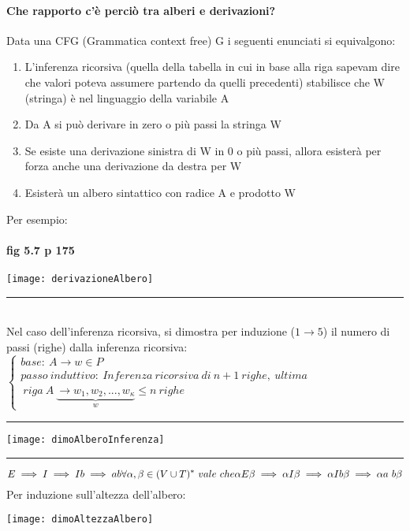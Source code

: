 \documentclass[12pt, a4paper, openany, oneside]{book}
\begin{document}
\paragraph{Che rapporto c'è perciò tra alberi e derivazioni?}  
Data una CFG (Grammatica context free) G i seguenti enunciati si equivalgono:
\begin{enumerate}
	\item L'inferenza ricorsiva (quella della tabella in cui in base alla riga
	sapevam dire che valori poteva assumere partendo da quelli precedenti) 
	stabilisce che W (stringa) è nel linguaggio della variabile A
	\item Da A si può derivare in zero o più passi la stringa W
	\item Se esiste una derivazione sinistra di W in 0 o più passi, allora
	esisterà per forza anche una derivazione da destra per W
	\item Esisterà un albero sintattico con radice A e prodotto W
\end{enumerate}
Per esempio: 
\paragraph{fig 5.7 p 175}
\begin{center}
\texttt{[image: derivazioneAlbero]}
\end{center}
{\color{black} \rule{\linewidth}{0.3mm}}
\\
Nel caso dell'inferenza ricorsiva, si dimostra per induzione ($1 \to 5$) il numero
di passi (righe) dalla inferenza ricorsiva: 
$\begin{cases}
base: ~ A \to w \in P \\
passo~induttivo: ~ Inferenza ~ ricorsiva ~  di ~  n+1  ~ righe, ~  ultima \\ 
~ riga ~  A ~ \underbrace{\to w_{1}, w_{2}, ..., w_{\kappa}}_{w} \leq n ~righe
\end{cases}$
\\
{\color{black} \rule{\linewidth}{0.3mm}}
\begin{center}
\texttt{[image: dimoAlberoInferenza]}
\end{center}
{\color{black} \rule{\linewidth}{0.3mm}}
\[E \implies I \implies Ib \implies ab \\
\forall \alpha, \beta \in (V \cup T)^{*} ~vale~ che \\
\alpha E \beta \implies \alpha I \beta \implies \alpha I b \beta \implies
\alpha a ~ b \beta\]
Per induzione sull'altezza dell'albero: 
\begin{center}
\texttt{[image: dimoAltezzaAlbero]}
\end{center}
\end{document}
